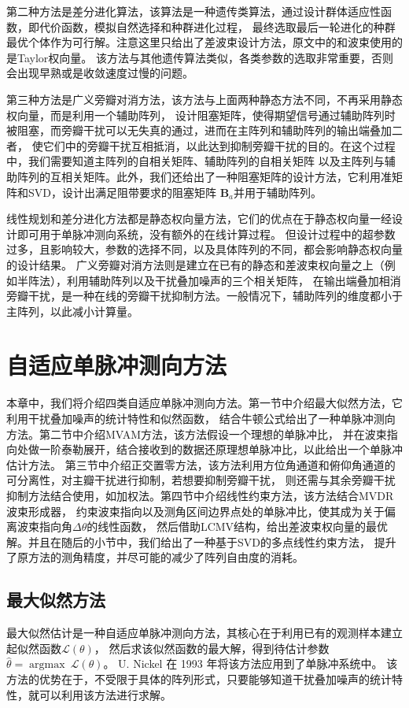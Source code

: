 \documentclass[master]{thesis-uestc}
\begin{document}
第二种方法是差分进化算法，该算法是一种遗传类算法，通过设计群体适应性函数，即代价函数，模拟自然选择和种群进化过程，
最终选取最后一轮进化的种群最优个体作为可行解。注意这里只给出了差波束设计方法，原文中的和波束使用的是Taylor权向量。
该方法与其他遗传算法类似，各类参数的选取非常重要，否则会出现早熟或是收敛速度过慢的问题。

第三种方法是广义旁瓣对消方法，该方法与上面两种静态方法不同，不再采用静态权向量，而是利用一个辅助阵列，
设计阻塞矩阵，使得期望信号通过辅助阵列时被阻塞，而旁瓣干扰可以无失真的通过，进而在主阵列和辅助阵列的输出端叠加二者，
使它们中的旁瓣干扰互相抵消，以此达到抑制旁瓣干扰的目的。在这个过程中，我们需要知道主阵列的自相关矩阵、辅助阵列的自相关矩阵
以及主阵列与辅助阵列的互相关矩阵。此外，我们还给出了一种阻塞矩阵的设计方法，它利用准矩阵和SVD，设计出满足阻带要求的阻塞矩阵
$\bm{B}_a$并用于辅助阵列。

线性规划和差分进化方法都是静态权向量方法，它们的优点在于静态权向量一经设计即可用于单脉冲测向系统，没有额外的在线计算过程。
但设计过程中的超参数过多，且影响较大，参数的选择不同，以及具体阵列的不同，都会影响静态权向量的设计结果。
广义旁瓣对消方法则是建立在已有的静态和差波束权向量之上（例如半阵法），利用辅助阵列以及干扰叠加噪声的三个相关矩阵，
在输出端叠加相消旁瓣干扰，是一种在线的旁瓣干扰抑制方法。一般情况下，辅助阵列的维度都小于主阵列，以此减小计算量。

\chapter{自适应单脉冲测向方法}
本章中，我们将介绍四类自适应单脉冲测向方法。第一节中介绍最大似然方法，它利用干扰叠加噪声的统计特性和似然函数，
结合牛顿公式给出了一种单脉冲测向方法。第二节中介绍MVAM方法，该方法假设一个理想的单脉冲比，
并在波束指向处做一阶泰勒展开，结合接收到的数据还原理想单脉冲比，以此给出一个单脉冲估计方法。
第三节中介绍正交置零方法，该方法利用方位角通道和俯仰角通道的可分离性，对主瓣干扰进行抑制，若想要抑制旁瓣干扰，
则还需与其余旁瓣干扰抑制方法结合使用，如加权法。第四节中介绍线性约束方法，该方法结合MVDR波束形成器，
约束波束指向以及测角区间边界点处的单脉冲比，使其成为关于偏离波束指向角$\Delta\theta$的线性函数，
然后借助LCMV结构，给出差波束权向量的最优解。并且在随后的小节中，我们给出了一种基于SVD的多点线性约束方法，
提升了原方法的测角精度，并尽可能的减少了阵列自由度的消耗。

\section{最大似然方法}
最大似然估计是一种自适应单脉冲测向方法，其核心在于利用已有的观测样本建立起似然函数$\mathcal{L}(\theta)$，
然后求该似然函数的最大解，得到待估计参数$\hat{\theta}=\operatorname{argmax}~\mathcal{L}(\theta)$。
U. Nickel 在 1993 年将该方法应用到了单脉冲系统中\cite{Nickel_93}。
该方法的优势在于，不受限于具体的阵列形式，只要能够知道干扰叠加噪声的统计特性，就可以利用该方法进行求解。
\end{document}
